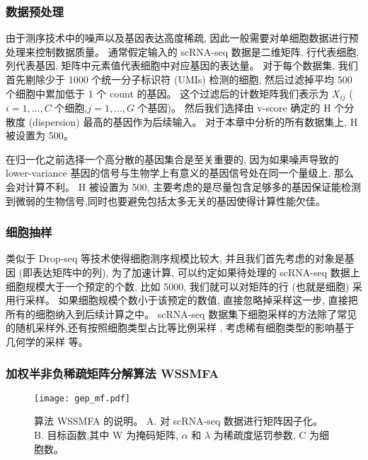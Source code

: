 \subsubsection{数据预处理}
由于测序技术中的噪声以及基因表达高度稀疏, 因此一般需要对单细胞数据进行预处理来控制数据质量。
通常假定输入的 scRNA-seq 数据是二维矩阵, 行代表细胞, 列代表基因, 矩阵中元素值代表细胞中对应基因的表达量。
对于每个数据集, 我们首先剔除少于 1000 个统一分子标识符 (UMIs) 检测的细胞,
然后过滤掉平均 500 个细胞中累加低于 1 个 count 的基因。
这个过滤后的计数矩阵我们表示为 $X_{ij}$ ($i=1,\ldots,C$ 个细胞,$j=1,\ldots,G$ 个基因)。
然后我们选择由 v-score \cite{klein2015droplet} 确定的 H 个分散度 (dispersion) 最高的基因作为后续输入。
对于本章中分析的所有数据集上, H 被设置为 500。

在归一化之前选择一个高分散的基因集合是至关重要的, 
因为如果噪声导致的 lower-variance 基因的信号与生物学上有意义的基因信号处在同一个量级上, 那么会对计算不利。 
H 被设置为 500, 主要考虑的是尽量包含足够多的基因保证能检测到微弱的生物信号,同时也要避免包括太多无关的基因使得计算性能欠佳。

\subsubsection{细胞抽样}
类似于 Drop-seq 等技术使得细胞测序规模比较大, 并且我们首先考虑的对象是基因 (即表达矩阵中的列), 
为了加速计算, 可以约定如果待处理的 scRNA-seq 数据上细胞规模大于一个预定的个数, 比如 5000,
我们就可以对矩阵的行 (也就是细胞) 采用行采样。
如果细胞规模个数小于该预定的数值, 直接忽略掉采样这一步, 
直接把所有的细胞纳入到后续计算之中。
 scRNA-seq 数据集下细胞采样的方法除了常见的随机采样外,还有按照细胞类型占比等比例采样 \cite{sinha2018dropclust},
考虑稀有细胞类型的影响基于几何学的采样 \cite{hie2019geometric} 等。

\subsubsection{加权半非负稀疏矩阵分解算法 WSSMFA}

\begin{figure}[!htbp]
    \centering
    \texttt{[image: gep\_mf.pdf]}
    \caption{
        算法 WSSMFA 的说明。
        A. 对 scRNA-seq 数据进行矩阵因子化。
        B. 目标函数,其中 W 为掩码矩阵, $\alpha$ 和 $\lambda$ 为稀疏度惩罚参数, C 为细胞数。
    }
    \label{fig:gep-mf}
\end{figure}

